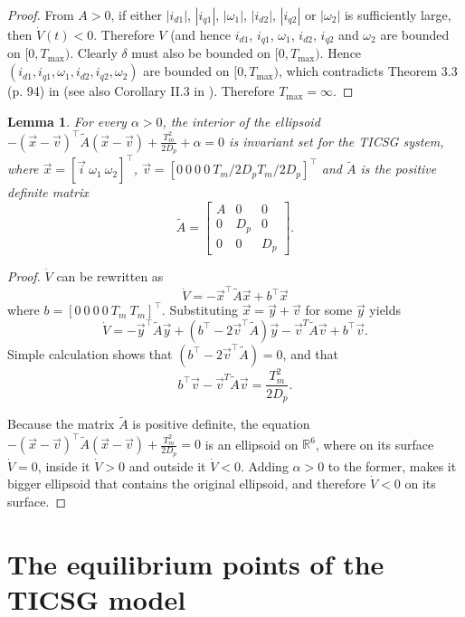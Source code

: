 \documentclass[letterpaper,10pt,conference]{ieeeconf}
\newtheorem{lemma}[theorem]{Lemma}
\renewcommand{\o}    {{\omega}}
\begin{document}
\begin{proof}
From $A>0$, if either $|i_{d1}|$, $|i_{q1}|$, $|\o_1|$, $|i_{d2}|$,
$|i_{q2}|$ or $|\o_2|$ is sufficiently large, then
$\dot{V}(t)<0$. Therefore $V$ (and hence $i_{d1}$, $i_{q1}$, $\o_1$,
$i_{d2}$, $i_{q2}$ and $\o_2$ are bounded on $[0,{T_{\max}})$. Clearly
$\delta$ must also be bounded on $[0,{T_{\max}})$. Hence $(i_{d1},
i_{q1},\o_1,i_{d2},i_{q2},\o_2)$ are bounded on $[0,{T_{\max}})$, which
contradicts Theorem 3.3 (p. 94) in \cite{Khalil} (see also Corollary 
II.3 in \cite{JayWeissBS:09}). Therefore ${T_{\max}}=\infty$.
\end{proof}

\begin{lemma}\label{lemma:invariantSet}
For every $\alpha > 0$, the interior of the ellipsoid $-(\vec{x}-\vec{v})^\top \tilde{A} (\vec{x}-\vec{v})+\frac{T_m^2}{2D_p}+\alpha=0$ is invariant set for the TICSG system, where $\vec{x} =\left[\vec{i}\ \omega_1\ \omega_2 \right]^\top$, 
$\vec{v} = \left[0\ 0\ 0\ 0\ T_m/2D_p T_m/2D_p \right]^\top$ and $\tilde{A}$ is the positive definite matrix
$$\tilde{A}=
\left[\begin{array}{ccc}
   A & 0 & 0 \\ 
   0 & D_p & 0 \\
   0 & 0 & D_p\end{array}\right].
$$
\end{lemma}

\begin{proof} $\dot{V}$ can be rewritten as 
$$\dot{V} = -\vec{x}^\top \tilde{A} \vec{x}+b^\top \vec{x}$$
where $b = \left[ 0\ 0\ 0\ 0\ T_m\ T_m\right]^\top$. Substituting $\vec{x}=\vec{y}+\vec{v}$ for some $\vec{y}$ yields  $$\dot{V} = -\vec{y}^\top \tilde{A} \vec{y}+\left(b^\top-2\vec{v}^\top \tilde{A}\right)\vec{y}  -\vec{v}^T \tilde{A} \vec{v} +b^\top\vec{v} .$$
Simple calculation shows that $\left(b^\top-2\vec{v}^\top \tilde{A}\right)=0$, and that $$b^\top\vec{v}-\vec{v}^T \tilde{A} \vec{v} =\frac{T_m^2}{2D_p}.$$

Because the matrix $\tilde{A}$ is positive definite, the equation $-(\vec{x}-\vec{v})^\top \tilde{A} (\vec{x}-\vec{v})+\frac{T_m^2}{2D_p}=0$ is an ellipsoid on $\mathbb{R}^6$, where on its surface $\dot{V}=0$, inside it $\dot{V}>0$ and outside it $\dot{V}<0$. Adding $\alpha>0$ to the former, makes it bigger ellipsoid that contains the original ellipsoid, and therefore  $\dot{V}<0$ on its surface.  
 \end{proof}
 
\section{The equilibrium points of the TICSG model} 
\label{sec4} %
\end{document}
